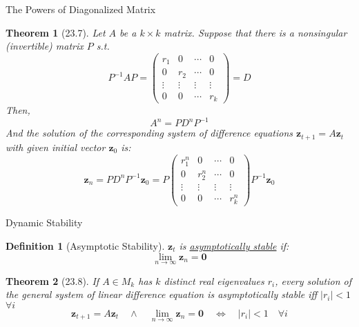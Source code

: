 \documentclass[final]{beamer}
\newtheorem{defn}{Definition}
\newtheorem{thm}{Theorem}
\newcommand{\bd}{\mathbf}
\begin{document}
\begin{frame}[t]{The Powers of Diagonalized Matrix}
	\begin{thm}
		[23.7]
		Let $A$ be a $k\times k$ matrix. Suppose that there is a nonsingular (invertible) matrix $P$ s.t. \[
			P^{-1}AP = \begin{pmatrix}
				r_1 & 0 & \cdots & 0\\
				0 & r_2 & \cdots & 0\\
				\vdots & \vdots & \vdots & \vdots\\
				0 & 0 & \cdots & r_k
			\end{pmatrix}=D \tag{Jordan Canonical Form}
		\] Then, \[
			A^n = P D^n P^{-1}
		\] And the solution of the corresponding system of difference equations $\bd{z}_{t+1}=A\bd{z}_t$ with given initial vector $\bd{z}_0$ is:
		\[
			\bd{z}_n = P D^n P^{-1} \bd{z}_0 = P \begin{pmatrix}
				r_1^n & 0 & \cdots & 0\\
				0 & r_2^n & \cdots & 0\\
				\vdots & \vdots & \vdots & \vdots\\
				0 & 0 & \cdots & r_k^n
			\end{pmatrix} P^{-1} \bd{z}_0
		\]
		
	\end{thm}
\end{frame}

\begin{frame}[t]{Dynamic Stability}
	\begin{defn}
		[Asymptotic Stability] $\bd{z}_t$ is \uline{asymptotically stable} if:\[
			\lim_{n\rightarrow\infty} \bd{z}_n = \bd{0}
		\]
	\end{defn}
	\begin{thm}
		[23.8] If $A\in M_k$ has $k$ distinct real eigenvalues $r_i$, every solution of the general system of linear difference equation is asymptotically stable iff $|r_i|<1$ $\forall i$\[
			\bd{z}_{t+1}=A\bd{z}_t\quad\land\quad\lim_{n\rightarrow\infty} \bd{z}_n = \bd{0} \quad\iff\quad |r_i|<1 \quad \forall i
		\]
	\end{thm}
\end{frame}
\end{document}
